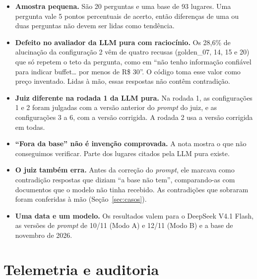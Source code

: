 \documentclass[11pt,a4paper]{article}
\begin{document}
\begin{itemize}
\item \textbf{Amostra pequena.} São 20 perguntas e uma base de 93 lugares. Uma pergunta vale 5 pontos percentuais de acerto, então diferenças de uma ou duas perguntas não devem ser lidas como tendência.
\item \textbf{Defeito no avaliador da LLM pura com raciocínio.} Os 28,6\% de alucinação da configuração 2 vêm de quatro recusas (golden\_07, 14, 15 e 20) que só repetem o teto da pergunta, como em ``não tenho informação confiável para indicar buffet\ldots{} por menos de R\$ 30''. O código toma esse valor como preço inventado. Lidas à mão, essas respostas não contêm contradição.
\item \textbf{Juiz diferente na rodada 1 da LLM pura.} Na rodada 1, as configurações 1 e 2 foram julgadas com a versão anterior do \textit{prompt} do juiz, e as configurações 3 a 6, com a versão corrigida. A rodada 2 usa a versão corrigida em todas.
\item \textbf{``Fora da base'' não é invenção comprovada.} A nota mostra o que não conseguimos verificar. Parte dos lugares citados pela LLM pura existe.
\item \textbf{O juiz também erra.} Antes da correção do \textit{prompt}, ele marcava como contradição respostas que diziam ``a base não tem'', comparando-as com documentos que o modelo não tinha recebido. As contradições que sobraram foram conferidas à mão (Seção~\ref{sec:casos}).
\item \textbf{Uma data e um modelo.} Os resultados valem para o DeepSeek V4.1 Flash, as versões de \textit{prompt} de 10/11 (Modo A) e 12/11 (Modo B) e a base de novembro de 2026.
\end{itemize}

\section{Telemetria e auditoria}
\end{document}
